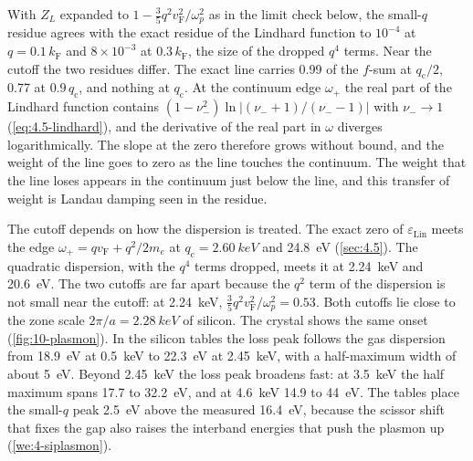 \noindent With $Z_L$ expanded to $1 - \tfrac35q^2v_{\mathrm{F}}^2/\omega_p^2$ as in the limit check below, the small-$q$ residue agrees with the exact residue of the Lindhard function to $10^{-4}$ at $q = 0.1\,k_{\mathrm{F}}$ and $8\times10^{-3}$ at $0.3\,k_{\mathrm{F}}$, the size of the dropped $q^4$ terms. Near the cutoff the two residues differ. The exact line carries 0.99 of the $f$-sum at $q_{\mathrm{c}}/2$, 0.77 at $0.9\,q_{\mathrm{c}}$, and nothing at $q_{\mathrm{c}}$. At the continuum edge $\omega_+$ the real part of the Lindhard function contains $(1 - \nu_-^2)\ln|(\nu_- + 1)/(\nu_- - 1)|$ with $\nu_- \to 1$ (\cref{eq:4.5-lindhard}), and the derivative of the real part in $\omega$ diverges logarithmically. The slope at the zero therefore grows without bound, and the weight of the line goes to zero as the line touches the continuum. The weight that the line loses appears in the continuum just below the line, and this transfer of weight is Landau damping seen in the residue.

The cutoff depends on how the dispersion is treated. The exact zero of $\varepsilon_{\mathrm{Lin}}$ meets the edge $\omega_+ = qv_{\mathrm{F}} + q^2/2m_e$ at $q_{\mathrm{c}} = \SI{2.60}{keV}$ and \SI{24.8}{eV} (\cref{sec:4.5}). The quadratic dispersion, with the $q^4$ terms dropped, meets it at \SI{2.24}{keV} and \SI{20.6}{eV}. The two cutoffs are far apart because the $q^2$ term of the dispersion is not small near the cutoff: at \SI{2.24}{keV}, $\tfrac35q^2v_{\mathrm{F}}^2/\omega_p^2 = 0.53$. Both cutoffs lie close to the zone scale $2\pi/a = \SI{2.28}{keV}$ of silicon. The crystal shows the same onset (\cref{fig:10-plasmon}). In the silicon tables the loss peak follows the gas dispersion from \SI{18.9}{eV} at \SI{0.5}{keV} to \SI{22.3}{eV} at \SI{2.45}{keV}, with a half-maximum width of about \SI{5}{eV}. Beyond \SI{2.45}{keV} the loss peak broadens fast: at \SI{3.5}{keV} the half maximum spans 17.7 to \SI{32.2}{eV}, and at \SI{4.6}{keV} 14.9 to \SI{44}{eV}. The tables place the small-$q$ peak \SI{2.5}{eV} above the measured \SI{16.4}{eV}, because the scissor shift that fixes the gap also raises the interband energies that push the plasmon up (\cref{we:4-siplasmon}).

